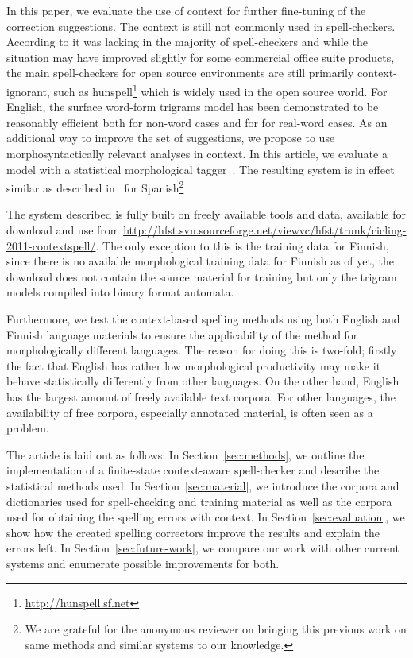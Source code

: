 \documentclass{llncs}
\begin{document}
In this paper, we evaluate the use of context for further fine-tuning of the
correction suggestions. The context is still not commonly used in
spell-checkers. According to \cite{kukich/1992} it was lacking in the majority
of spell-checkers and while the situation may have improved slightly for some
commercial office suite products, the main spell-checkers for open source
environments are still primarily context-ignorant, such as
hunspell\footnote{\url{http://hunspell.sf.net}} which is widely used in the
open source world.  For English, the surface word-form trigrams model has been
demonstrated to be reasonably efficient both for non-word cases
\cite{church/1991} and for for real-word cases\cite{mays/1991}. As an
additional way to improve the set of suggestions, we propose to use
morphosyntactically relevant analyses in context. In this article, we evaluate
a model with a statistical morphological tagger~\cite{silfverberg/2011}.  The
resulting system is in effect similar as described in~\cite{otero/2007} for
Spanish\footnote{We are grateful for the anonymous reviewer on bringing this
previous work on same methods and similar systems to our knowledge.}

The system described is fully built on freely available tools and data,
available for download and use from 
\url{http://hfst.svn.sourceforge.net/viewvc/hfst/trunk/cicling-2011-contextspell/}.
The only exception to this is the training data for Finnish, since there is no
available morphological training data for Finnish as of yet, the download does
not contain the source material for training but only the trigram models
compiled into binary format automata.

Furthermore, we test the context-based spelling methods using both English and
Finnish language materials to ensure the applicability of the method for
morphologically different languages. The reason for doing this is two-fold;
firstly the fact that English has rather low morphological productivity may
make it behave statistically differently from other languages. On the other
hand, English has the largest amount of freely available text corpora. For
other languages, the availability of free corpora, especially annotated
material, is often seen as a problem.

The article is laid out as follows: In Section~\ref{sec:methods}, we outline
the implementation of a finite-state context-aware spell-checker and describe
the statistical methods used.  In Section~\ref{sec:material}, we introduce the
corpora and dictionaries used for spell-checking and training material as well
as the corpora used for obtaining the spelling errors with context. In
Section~\ref{sec:evaluation}, we show how the created spelling correctors
improve the results and explain the errors left. In
Section~\ref{sec:future-work}, we compare our work with other current systems
and enumerate possible improvements for both.
\end{document}
